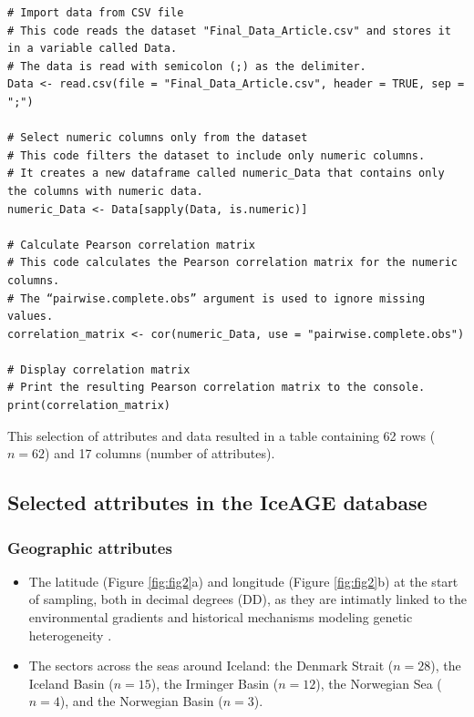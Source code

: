 \begin{lstlisting}[label=lst:pearson,language=RStudio,caption=RStudio script to calculate the Pearson correlation coefficient between all the numerical attributes in our final dataset]
# Import data from CSV file
# This code reads the dataset "Final_Data_Article.csv" and stores it in a variable called Data.
# The data is read with semicolon (;) as the delimiter.
Data <- read.csv(file = "Final_Data_Article.csv", header = TRUE, sep = ";")

# Select numeric columns only from the dataset
# This code filters the dataset to include only numeric columns.
# It creates a new dataframe called numeric_Data that contains only the columns with numeric data.
numeric_Data <- Data[sapply(Data, is.numeric)]

# Calculate Pearson correlation matrix
# This code calculates the Pearson correlation matrix for the numeric columns.
# The “pairwise.complete.obs” argument is used to ignore missing values.
correlation_matrix <- cor(numeric_Data, use = "pairwise.complete.obs")

# Display correlation matrix
# Print the resulting Pearson correlation matrix to the console.
print(correlation_matrix)
\end{lstlisting}

This selection of attributes and data resulted in a table containing 62 rows ($n=62$) and 17 columns (number of attributes). 

\subsection{Selected attributes in the IceAGE database}

\subsubsection{Geographic attributes} 

\begin{itemize}
\item The latitude (Figure \ref{fig:fig2}a) and longitude (Figure \ref{fig:fig2}b) at the start of sampling, both in decimal degrees (DD), as they are intimatly linked to the environmental gradients and historical mechanisms modeling genetic heterogeneity \citep{gaither2013origins}.
\item The sectors across the seas around Iceland: the Denmark Strait ($n=28$), the Iceland Basin ($n=15$), the Irminger Basin ($n=12$), the Norwegian Sea ($n=4$), and the Norwegian Basin ($n=3$). 
\end{itemize}

